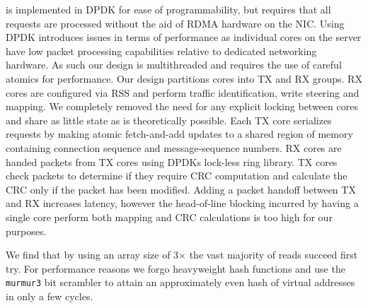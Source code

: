 {\sword} is implemented in DPDK for ease of programmability, but
requires that all requests are processed without the aid of RDMA
hardware on the NIC. Using DPDK introduces issues in terms of
performance as individual cores on the server have low packet
processing capabilities relative to dedicated networking hardware. As
such our design is multithreaded and requires the use of careful
atomics for performance.  Our design partitions cores into TX and RX
groups. RX cores are configured via RSS and perform traffic
identification, write steering and mapping. We completely removed the
need for any explicit locking between cores and share as little state
as is theoretically possible. Each TX core serializes requests by
making atomic fetch-and-add updates to a shared region of memory
containing connection sequence and message-sequence numbers. RX cores
are handed packets from TX cores using DPDKs lock-less ring
library. TX cores check packets to determine if they require CRC
computation and calculate the CRC only if the packet has been
modified. Adding a packet handoff between TX and RX increases latency,
however the head-of-line blocking incurred by having a single core
perform both mapping and CRC calculations is too high for our purposes.

We find that by using an array size of
3$\times$ the vast majority of reads succeed first try.
For
performance reasons we forgo heavyweight hash functions and use
the \texttt{murmur3} bit scrambler to attain an approximately even
hash of virtual addresses in only a few cycles.



